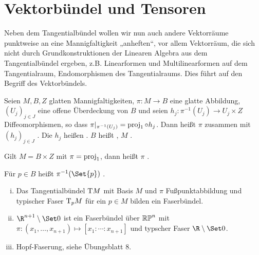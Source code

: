 \chapter{Vektorbündel und Tensoren}


Neben dem Tangentialbündel wollen wir nun auch andere Vektorräume punktweise an eine Mannigfaltigkeit „anheften“, vor allem Vektorräum, die sich nicht durch Grundkonstruktionen der Linearen Algebra aus dem Tangentialbündel ergeben, z.B. Linearformen und Multilinearformen auf dem Tangentialraum, Endomorphismen des Tangentialraums.
Dies führt auf den Begriff des Vektorbündels.

\begin{df}[Faserbündel] \label{5.1}
    Seien $M, B, Z$ glatten Mannigfaltigkeiten, $\pi: M \to B$ eine glatte Abbildung, $(U_j)_{j\in J}$ eine offene Überdeckung von $B$ und seien
    \begin{math}
        h_j: \pi^{-1}(U_j) \to U_j \times Z
    \end{math}
    Diffeomorphismen, so dass $\pi|_{\pi^{-1}(U_j)} = \operatorname{proj}_1 \circ h_j$.
    Dann heißt $\pi$ zusammen mit $(h_j)_{j\in J}$ .
    Die $h_j$ heißen .
    $B$ heißt , $M$ .

    Gilt $M = B \times Z$ mit $\pi = \operatorname{proj}_1$, dann heißt $\pi$ .

    Für $p \in B$ heißt $\pi^{-1}(\Set{p})$ .
\end{df}

\begin{ex*}
    \begin{enumerate}[(i)]
        \item
            Das Tangentialbündel $\mathrm{T} M$ mit Basis $M$ und $\pi$ Fußpunktabbildung und typischer Faser $\mathrm{T}_p M$ für ein $p \in M$ bilden ein Faserbündel.
        \item
            $\R^{n+1} \setminus \Set 0$ ist ein Faserbündel über $\mathbb{RP}^n$ mit
            \begin{math}
                \pi: (x_1, \dotsc, x_{n+1}) \mapsto [x_1: \dotsb : x_{n+1}]
            \end{math}
            und typscher Faser $\R \setminus \Set 0$.
        \item
            Hopf-Faserung, siehe Übungsblatt 8.
    \end{enumerate}
\end{ex*}

